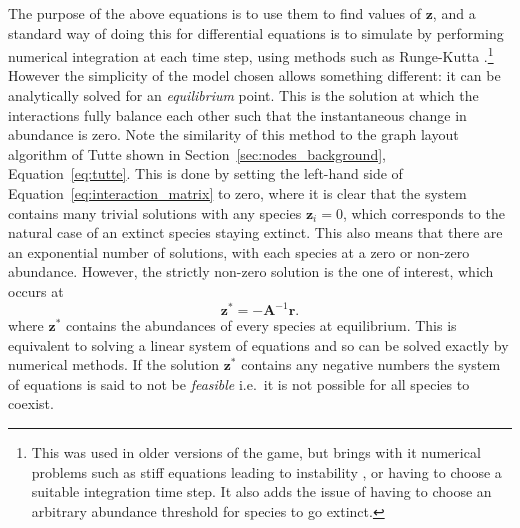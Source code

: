 The purpose of the above equations is to use them to find values of $\mathbf{z}$, and a standard way of doing this for differential equations is to simulate by performing numerical integration at each time step, using methods such as Runge-Kutta \cite{Press2007Runge}.\footnote{This was used in older versions of the game, but brings with it numerical problems such as stiff equations leading to instability \cite{Press2007Runge}, or having to choose a suitable integration time step. It also adds the issue of having to choose an arbitrary abundance threshold for species to go extinct.}
However the simplicity of the model chosen allows something different: it can be analytically solved for an \emph{equilibrium} point. This is the solution at which the interactions fully balance each other such that the instantaneous change in abundance is zero. Note the similarity of this method to the graph layout algorithm of Tutte shown in Section~\ref{sec:nodes_background}, Equation~\eqref{eq:tutte}.
This is done by setting the left-hand side of Equation~\eqref{eq:interaction_matrix} to zero, where it is clear that the system contains many trivial solutions with any species $\mathbf{z}_i=0$, which corresponds to the natural case of an extinct species staying extinct. This also means that there are an exponential number of solutions, with each species at a zero or non-zero abundance.
However, the strictly non-zero solution is the one of interest, which occurs at
\begin{equation}
  \mathbf{z^*} = -\mathbf{A}^{-1}\mathbf{r}.
  \label{eq:equilibrium}
\end{equation}
where $\mathbf{z}^*$ contains the abundances of every species at equilibrium.
This is equivalent to solving a linear system of equations and so can be solved exactly by numerical methods.
If the solution $\mathbf{z^*}$ contains any negative numbers the system of equations is said to not be \emph{feasible} i.e.\ it is not possible for all species to coexist.

